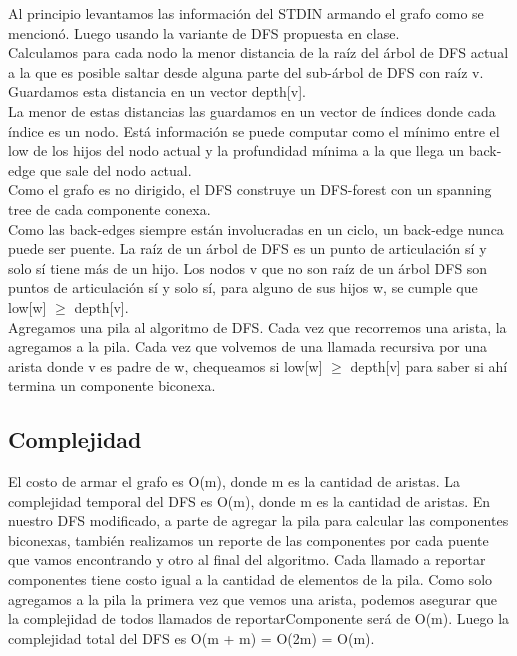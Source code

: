 \documentclass[a4paper]{article}
\begin{document}
Al principio levantamos las información del STDIN armando el grafo como se mencionó.
Luego usando la variante de DFS propuesta en clase.\\
Calculamos para cada nodo la menor distancia de la raíz del árbol de DFS actual a la que es posible saltar desde alguna parte del sub-árbol de DFS con raíz v. Guardamos esta distancia en un vector depth[v].\\

La menor de estas distancias las guardamos en un vector de índices donde cada índice es un nodo.  Está información se puede computar como el mínimo entre el low de los hijos del nodo actual y la profundidad mínima a la que llega un back-edge que sale del nodo actual.\\

Como el grafo es no dirigido, el DFS construye un DFS-forest con un spanning tree de cada componente conexa.\\
Como las back-edges siempre están involucradas en un ciclo, un back-edge nunca puede ser puente.
La raíz de un árbol de DFS es un punto de articulación sí y solo sí tiene más de un hijo.
Los nodos v que no son raíz de un árbol DFS son puntos de articulación sí y solo sí, para alguno de sus hijos w, se cumple que low[w] $\geq$ depth[v].\\

Agregamos una pila al algoritmo de DFS.
Cada vez que recorremos una arista, la agregamos a la pila.
Cada vez que volvemos de una llamada recursiva por una arista donde v es padre de w, chequeamos si
low[w] $\geq$ depth[v] para saber si ahí termina un componente biconexa.\\



\subsection{Complejidad}

El costo de armar el grafo es O(m), donde m es la cantidad de aristas.
La complejidad temporal del DFS es O(m), donde m es la cantidad de aristas.
En nuestro DFS modificado, a parte de agregar la pila para calcular las componentes biconexas, también realizamos un reporte de las componentes por cada puente que vamos encontrando y otro al final del algoritmo. Cada llamado a reportar componentes tiene costo igual a la cantidad de elementos de la pila. Como solo agregamos a la pila la primera vez que vemos una arista, podemos asegurar que la complejidad de todos llamados de reportarComponente será de O(m). 
Luego la complejidad total del DFS es O(m + m) = O(2m) = O(m).\\
\end{document}
